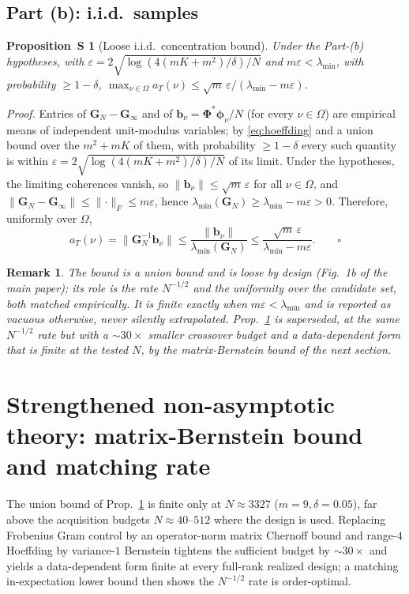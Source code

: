\documentclass[10pt]{article}
\newtheorem{proposition}{Proposition~S}
\newtheorem{remark}{Remark}
\newcommand{\Om}{\Omega}
\newcommand{\Phimat}{\bm{\Phi}}
\newcommand{\norm}[1]{\lVert#1\rVert}
\newcommand{\at}{a_T}
\begin{document}
\subsection{Part (b): i.i.d.\ samples}

\begin{proposition}[Loose i.i.d.\ concentration bound]\label{prop:conc-loose}
Under the Part-(b) hypotheses, with $\varepsilon=2\sqrt{\log(4(mK+m^2)/\delta)/N}$ and
$m\varepsilon<\lambda_{\min}$, with probability $\ge1-\delta$,
$\max_{\nu\in\Om}\at(\nu)\le\sqrt m\,\varepsilon/(\lambda_{\min}-m\varepsilon)$.
\end{proposition}
\noindent\emph{Proof.}
Entries of $\bm G_N-\bm G_\infty$ and of $\bm b_\nu=\Phimat^{*}\bm\phi_\nu/N$ (for every
$\nu\in\Omega$) are empirical means of independent unit-modulus variables; by
\eqref{eq:hoeffding} and a union bound over the $m^2+mK$ of them, with probability
$\ge1-\delta$ every such quantity is within
$\varepsilon=2\sqrt{\log(4(mK+m^2)/\delta)/N}$ of its limit.  Under the hypotheses, the
limiting coherences vanish, so $\norm{\bm b_\nu}\le\sqrt m\,\varepsilon$ for all
$\nu\in\Omega$, and $\norm{\bm G_N-\bm G_\infty}\le\norm{\cdot}_F\le m\varepsilon$, hence
$\lambda_{\min}(\bm G_N)\ge\lambda_{\min}-m\varepsilon>0$.  Therefore, uniformly over
$\Omega$,
\[
\at(\nu)=\norm{\bm G_N^{-1}\bm b_\nu}
\le\frac{\norm{\bm b_\nu}}{\lambda_{\min}(\bm G_N)}
\le\frac{\sqrt m\,\varepsilon}{\lambda_{\min}-m\varepsilon}. \qquad\square
\]

\begin{remark}
The bound is a union bound and is loose by design (Fig.~1b of the main paper); its role
is the \emph{rate} $N^{-1/2}$ and the uniformity over the candidate set, both matched
empirically.  It is finite exactly when $m\varepsilon<\lambda_{\min}$ and is reported as
vacuous otherwise, never silently extrapolated.  Prop.~\ref{prop:conc-loose} is superseded,
at the same $N^{-1/2}$ rate but with a $\sim\!30\times$ smaller crossover budget and a
data-dependent form that is finite at the tested $N$, by the matrix-Bernstein bound of the
next section.
\end{remark}

\section{Strengthened non-asymptotic theory: matrix-Bernstein bound and matching rate}
\label{sup:strong}
The union bound of Prop.~\ref{prop:conc-loose} is finite only at $N\!\approx\!3327$
($m{=}9,\delta{=}0.05$), far above the acquisition budgets $N\!\approx\!40$--$512$ where the
design is used.  Replacing Frobenius Gram control by an operator-norm matrix Chernoff bound and
range-$4$ Hoeffding by variance-$1$ Bernstein tightens the sufficient budget by $\sim\!30\times$
and yields a data-dependent form finite at every full-rank realized design; a matching
in-expectation lower bound then shows the $N^{-1/2}$ rate is order-optimal.


\end{document}
